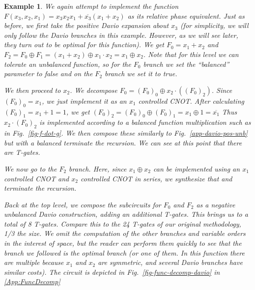 \documentclass[paper]{ieice}
\newtheorem{example}{Example}
\providecommand{\DIFadd}[1]{{\protect\color{blue}{#1}}} %
\providecommand{\DIFaddbegin}{} %
\providecommand{\DIFaddend}{} %
\newcommand{\DIFaddincludegraphics}[2][]{{\color{blue}\fbox{\DIFOincludegraphics[#1]{#2}}}} %
\DeclareRobustCommand{\DIFaddbegin}{\DIFOaddbegin \let\includegraphics\DIFaddincludegraphics} %
\DeclareRobustCommand{\DIFaddend}{\DIFOaddend \let\includegraphics\DIFOincludegraphics} %
\begin{document}
\begin{example}
  \label{ex-davio}
    We again attempt to implement the function $F(x_3,x_2,x_1) = x_3x_2x_1 + \overline{x_3}(x_1 + x_2)$ as its relative phase equivalent.
    Just as before, we first take the positive Davio expansion about $x_3$ (for simplicity, we will only follow the Davio branches
  in this example. However, as  we will see later, they turn out to be optimal for this function). We get $F_0 = x_1 + x_2$ and
  $F_2 = F_0 \oplus F_1 = (x_1 + x_2) \oplus x_1 \cdot x_2 = x_1 \oplus x_2$. Note that for this level we can tolerate an unbalanced
  function, so for the $F_0$ branch we set the ``balanced'' parameter to false and on the $F_2$ branch we set it to true.

  We then proceed to $x_2$. We decompose $F_0 = (F_0)_0 \oplus x_2 \cdot ((F_0)_2)$. Since $(F_0)_0 = x_1$, we just implement it as an $x_1$
  controlled CNOT. After calculating $(F_0)_1 = x_1 + 1 = 1$, we get $(F_0)_2 = (F_0)_0 \oplus (F_0)_1 = x_1 \oplus 1 = \overline{x_1}$
  Thus $x_2 \cdot (F_0)_2$ is implemented according to a balanced function multiplication such as in Fig.~\ref{fig-f-dot-g}. We then compose
  these similarly to Fig.~\ref{app-davio-pos-unb} but with a balanced  \DIFaddbegin \DIFadd{construction and }\DIFaddend terminate the recursion. We can see at this point that
  there are  \DIFaddbegin \DIFadd{four }\DIFaddend T-gates.

  We now go to the $F_2$ branch. Here, since $x_1 \oplus x_2$ can be implemented using an $x_1$ controlled CNOT and $x_2$ controlled CNOT
  in series, we synthesize that and terminate the recursion.

  Back at the top level, we compose the subcircuits for $F_0$ and $F_2$ as a negative unbalanced Davio construction, adding an additional  \DIFaddbegin \DIFadd{four
  }\DIFaddend T-gates. This brings us to a total of 8 T-gates. Compare this to the 24 T-gates of our original methodology, 1/3 the size. We omit
  the computation of the other branches and variable orders in the interest of space, but the reader can perform them  quickly to
  see that the branch we followed is the optimal branch (or one of them. In this function there are multiple because $x_1$  and
  $x_2$ are symmetric, and several Davio branches have similar costs). 
  The  \DIFaddbegin \DIFadd{resulting }\DIFaddend circuit is depicted in Fig.~\ref{fig-func-decomp-davio} in \ref{App:FuncDecomp}\DIFaddbegin \DIFadd{.
 }\DIFaddend 

\end{example}
\end{document}
